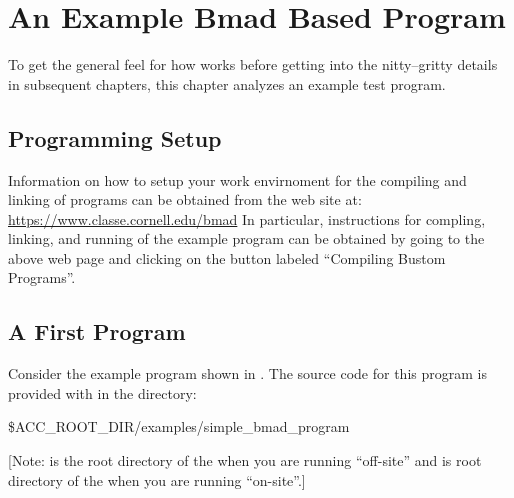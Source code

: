 \chapter{An Example Bmad Based Program}
\label{c:program.info}

To get the general feel for how \bmad works before getting into the nitty--gritty details in
subsequent chapters, this chapter analyzes an example test program.

\section{Programming Setup}
\label{s:prog.setup}

Information on how to setup your work envirnoment for the compiling and linking of programs can be
obtained from the \bmad web site at:
\hfill\break
\hspace*{0.3in}
\url{https://www.classe.cornell.edu/bmad}
In particular, instructions for compling, linking, and running of the example program can be
obtained by going to the above web page and clicking on the button labeled ``Compiling Bustom Programs''.

\section{A First Program}
\label{s:first.program}

Consider the example program shown in . The source code for this program is provided
with \bmad in the directory:
\begin{example}
  \$ACC_ROOT_DIR/examples/simple_bmad_program
\end{example}
[Note:  is the root directory of the \bmad {} when you are running
``off-site'' and is root directory of the  when you are running ``on-site''.]

